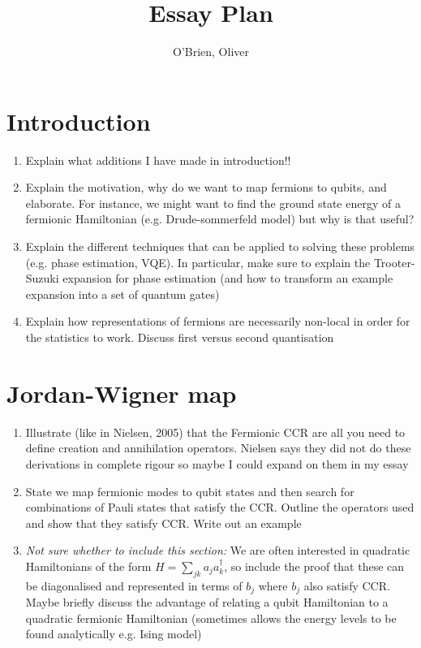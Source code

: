 \documentclass[twoside]{article}
\begin{document}
\title{Essay Plan}
\author{ O'Brien, Oliver}

\maketitle
\section{Introduction}
\begin{enumerate}
        \item Explain what additions I have made in introduction!!
        \item Explain the motivation, why do we want to map fermions to qubits, and elaborate. For instance, we might want to find the ground state energy of a fermionic Hamiltonian (e.g. Drude-sommerfeld model) but why is that useful?
        \item Explain the different techniques that can be applied to solving these problems (e.g. phase estimation, VQE). In particular, make sure to explain the Trooter-Suzuki expansion for phase estimation (and how to transform an example expansion into a set of quantum gates)
        \item Explain how representations of fermions are necessarily non-local in order for the statistics to work. Discuss first versus second quantisation
\end{enumerate}
\section{Jordan-Wigner map}
\begin{enumerate}
        \item Illustrate (like in Nielsen, 2005) that the Fermionic CCR are all you need to define creation and annihilation operators. Nielsen says they did not do these derivations in complete rigour so maybe I could expand on them in my essay
        \item State we map fermionic modes to qubit states and then search for combinations of Pauli states that satisfy the CCR. Outline the operators used and show that they satisfy CCR. Write out an example
        \item  \textit{Not sure whether to include this section:} We are often interested in quadratic Hamiltonians of the form $H = \sum_{jk} a_j a^{\dagger}_k$, so include the proof that these can be diagonalised and represented in terms of $b_j$ where $b_j$ also satisfy CCR. Maybe briefly discuss the advantage of relating a qubit Hamiltonian to a quadratic fermionic Hamiltonian (sometimes allows the energy levels to be found analytically e.g. Ising model)
\end{enumerate}
\end{document}
